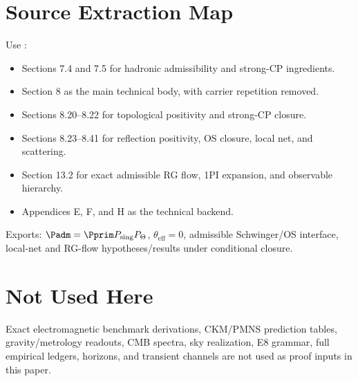 \tfptDraftXrefNotice



\section{Source Extraction Map}

\begin{tfptsourcebox}
Use \sourceDraft:
\begin{itemize}[leftmargin=1.5em]
    \item Sections 7.4 and 7.5 for hadronic admissibility and strong-CP ingredients.
    \item Section 8 as the main technical body, with carrier repetition removed.
    \item Sections 8.20--8.22 for topological positivity and strong-CP closure.
    \item Sections 8.23--8.41 for reflection positivity, OS closure, local net, and scattering.
    \item Section 13.2 for exact admissible RG flow, 1PI expansion, and observable hierarchy.
    \item Appendices E, F, and H as the technical backend.
\end{itemize}
\end{tfptsourcebox}


\begin{tfptexports}
Exports: $\Padm=\Pprim P_{\mathrm{sing}}P_\Theta$, $\theta_{\mathrm{eff}}=0$, admissible Schwinger/OS interface, local-net and RG-flow hypotheses/results under conditional closure.
\end{tfptexports}

\section{Not Used Here}

Exact electromagnetic benchmark derivations, CKM/PMNS prediction tables, gravity/metrology
readouts, CMB spectra, sky realization, E8 grammar, full empirical ledgers, horizons, and transient
channels are not used as proof inputs in this paper.


